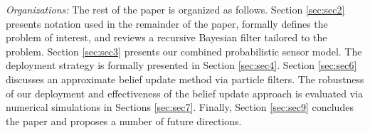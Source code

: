 \documentclass[letterpaper, 10 pt, conference]{ieeeconf}
\newcommand{\Ram}[1]{{\normalsize{\textbf{({\color{green}Ram:\ }#1)}}}}
\newcommand{\HJP}[1]{{\normalsize{\textbf{({\color{blue}Hyongju:\ }#1)}}}}
\begin{document}
%
%

\textit{Organizations:}
The rest of the paper is organized as follows. 
Section \ref{sec:sec2} presents notation used in the remainder of the paper, formally defines the problem of interest, and reviews a recursive Bayesian filter tailored to the problem.
Section \ref{sec:sec3} presents our combined probabilistic sensor model. 
The deployment strategy is formally presented in Section \ref{sec:sec4}. Section \ref{sec:sec6} discusses an approximate belief update method via particle filters. The robustness of our deployment and effectiveness of the belief update approach is evaluated via numerical simulations in Sections \ref{sec:sec7}. Finally, Section \ref{sec:sec9} concludes the paper and proposes a number of future directions.
\end{document}
